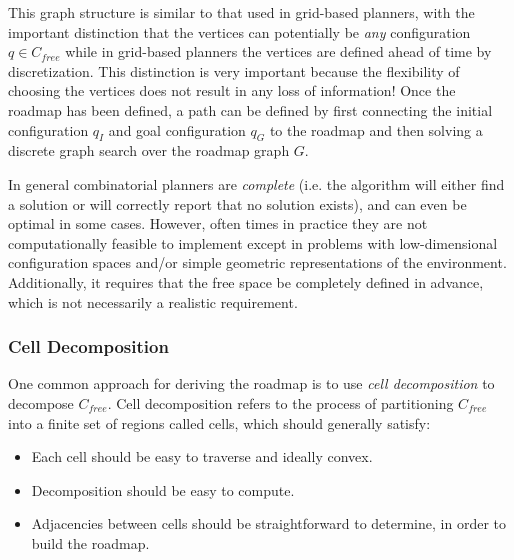 This graph structure is similar to that used in grid-based planners, with the important distinction that the vertices can potentially be \textit{any} configuration $q \in C_{free}$ while in grid-based planners the vertices are defined ahead of time by discretization. This distinction is very important because the flexibility of choosing the vertices does not result in any loss of information!
Once the roadmap has been defined, a path can be defined by first connecting the initial configuration $q_I$ and goal configuration $q_G$ to the roadmap and then solving a discrete graph search over the roadmap graph $G$.

In general combinatorial planners are \textit{complete} (i.e. the algorithm will either find a solution or will correctly report that no
solution exists), and can even be optimal in some cases. However, often times in practice they are not computationally feasible to implement except in problems with low-dimensional configuration spaces and/or simple geometric representations of the environment. Additionally, it requires that the free space be completely defined in advance, which is not necessarily a realistic requirement.

\subsubsection{Cell Decomposition}
One common approach for deriving the roadmap is to use \textit{cell decomposition} to decompose $C_{free}$.
Cell decomposition refers to the process of partitioning $C_{free}$ into a finite set of regions called cells, which should generally satisfy:
\begin{itemize}
    \item Each cell should be easy to traverse and ideally convex.
    \item Decomposition should be easy to compute.
    \item Adjacencies between cells should be straightforward to determine, in order to build the roadmap.
\end{itemize}

